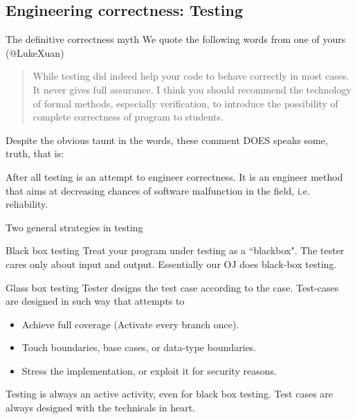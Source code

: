 \subsection{Engineering correctness: Testing}
\begin{frame}{The definitive correctness myth}
We quote the following words from one of yours (@LukeXuan)
\begin{quotation}
	While testing did indeed help your code to behave correctly in most cases. It never gives full assurance. I think you should recommend the technology of formal methods, especially verification, to introduce the possibility of complete correctness of program to students.
\end{quotation}
Despite the obvious taunt in the words, these comment DOES speaks some, truth, that is:
\begin{center}
\end{center}
After all testing is an attempt to engineer correctness. It is an engineer method that aims at decreasing chances of software malfunction in the field, i.e. reliability.
\end{frame}

\begin{frame}{Two general strategies in testing}
\begin{block}{Black box testing}
	Treat your program under testing as a ``blackbox". The tester cares only about input and output. Essentially our OJ does black-box testing.
\end{block}
\begin{block}{Glass box testing}
	Tester designs the test case according to the case. Test-cases are designed in such way that attempts to
	\begin{itemize}
		\item Achieve full coverage (Activate every branch once).
		\item Touch boundaries, base cases, or data-type boundaries.
		\item Stress the implementation, or exploit it for security reasons.
	\end{itemize}
\end{block}
\alert{Testing is always an active activity}, even for black box testing. Test cases are always designed with the technicals in heart.
\end{frame}


